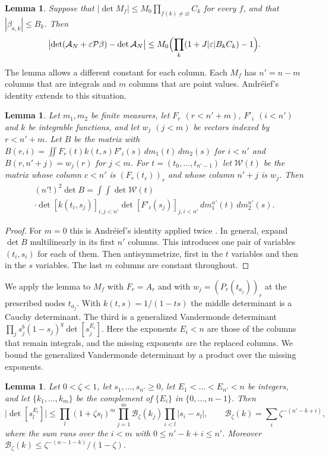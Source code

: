 \documentclass[11pt]{amsart}
\newtheorem{lemma}[theorem]{Lemma}
\theoremstyle{definition}
\theoremstyle{remark}
\numberwithin{equation}{section}
\newcommand{\cA}{\mathcal A}
\begin{document}
\begin{lemma}\label{lem:expansion}
Suppose that $|\det M_f|\le M_0\prod_{f(k)\ne\varnothing}C_k$ for every $f$, and that $|\beta_{a,k}|\le B_k$.
Then
\[
 \bigl|\det(\cA_N+\varepsilon\mathcal P\beta)-\det\cA_N\bigr|\le M_0\Bigl(\prod_k(1+J|\varepsilon|B_kC_k)-1\Bigr).
\]
\end{lemma}

The lemma allows a different constant for each column. Each $M_f$ has $n'=n-m$ columns that are integrals
and $m$ columns that are point values. Andr\'eief's identity extends to this situation.

\begin{lemma}\label{lem:andreief}
Let $m_1,m_2$ be finite measures, let $F_r$ $(r<n'+m)$, $F'_i$ $(i<n')$ and $k$ be integrable functions, and let
$w_j$ $(j<m)$ be vectors indexed by $r<n'+m$. Let $B$ be the matrix with
$B(r,i)=\iint F_r(t)k(t,s)F'_i(s)\,dm_1(t)\,dm_2(s)$ for $i<n'$ and $B(r,n'+j)=w_j(r)$ for $j<m$. For
$t=(t_0,\ldots,t_{n'-1})$ let $\mathcal W(t)$ be the matrix whose column $c<n'$ is $(F_r(t_c))_r$ and whose column $n'+j$ is
$w_j$. Then
\begin{multline*}
 (n'!)^2\det B=\int\!\!\int\det\mathcal W(t)\\
 \cdot\det[k(t_i,s_j)]_{i,j<n'}\det[F'_i(s_j)]_{j,i<n'}\,dm_1^{n'}(t)\,dm_2^{n'}(s).
\end{multline*}
\end{lemma}

\begin{proof}
For $m=0$ this is Andr\'eief's identity applied twice \cite{Forrester2018Andreief}. In general, expand
$\det B$ multilinearly in its first $n'$ columns. This introduces one pair of variables $(t_i,s_i)$ for each
of them. Then antisymmetrize, first in the $t$ variables and then in the $s$ variables. The last $m$ columns
are constant throughout.
\end{proof}

We apply the lemma to $M_f$ with $F_r=A_r$ and with $w_j=(P_r(t_{a_j}))_r$ at the prescribed nodes $t_{a_j}$.
With $k(t,s)=1/(1-ts)$ the middle determinant is a Cauchy determinant. The third is a generalized
Vandermonde determinant $\prod_js_j^b(1-s_j)^q\det[s_j^{E_i}]$. Here the exponents $E_i<n$ are those of the
columns that remain integrals, and the missing exponents are the replaced columns. We bound the generalized
Vandermonde determinant by a product over the missing exponents.

\begin{lemma}\label{lem:binomvand}
Let $0<\zeta<1$, let $s_1,\ldots,s_{n'}\ge0$, let $E_1<\dots<E_{n'}<n$ be integers, and let $\{k_1,\ldots,k_m\}$ be
the complement of $\{E_i\}$ in $\{0,\ldots,n-1\}$. Then
\[
 \bigl|\det[s_l^{E_i}]\bigr|\le\prod_l(1+\zeta s_l)^m\prod_{j=1}^m\mathcal B_\zeta(k_j)\prod_{i<l}|s_i-s_l|,\qquad
 \mathcal B_\zeta(k)=\sum_{i}\zeta^{-(n'-k+i)},
\]
where the sum runs over the $i<m$ with $0\le n'-k+i\le n'$. Moreover $\mathcal B_\zeta(k)\le\zeta^{-(n-1-k)}/(1-\zeta)$.
\end{lemma}
\end{document}

